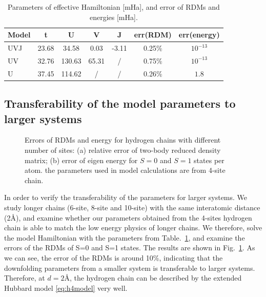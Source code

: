 \documentclass[aps, prb]{revtex4-1}
\begin{document}
\begin{table}[hbt]
\centering
\caption{Parameters of effective Hamiltonian [mHa], and error of RDMs and energies [mHa].}\label{tab:effm_hchain}
\begin{tabular}{||l|c|c|c|c||c|c||}
\hline
Model & t & U & V & J & err(RDM) & err(energy)\\
\hline
\hline
UVJ & 23.68 & 34.58 & 0.03 & -3.11 & 0.25\% & $10^{-13}$\\
UV & 32.76 & 130.63 & 65.31 & / & 0.75\% & $10^{-13}$\\
U & 37.45 & 114.62 & / & / & 0.26\% & $1.8$\\
\hline
\end{tabular}
\end{table}

\subsection{Transferability of the model parameters to larger systems} 
\begin{figure}[hbt]
\centering
{}
\caption{Errors of RDMs and energy for hydrogen chains with different number of sites: (a) relative error of two-body reduced density matrix; (b) error of eigen energy for $S=0$ and $S=1$ states per atom. the parameters used in model calculations are from 4-site chain.}\label{fig:h4transfer}
\end{figure}
In order to verify the transferability of the parameters for larger systems. We study longer chains (6-site, 8-site and 10-site) with the same interatomic distance (2\AA), and examine whether our parameters obtained from the 4-sites hydrogen chain is able to match the low energy physics of longer chains. We therefore, solve the model Hamiltonian with the parameters
from Table.~\ref{tab:effm_hchain}, and examine the errors of the RDMs of S=0 and S=1 states. The results are
shown in Fig.~\ref{fig:h4transfer}. As we can see, the error of the RDMs is around 10\%, indicating that the downfolding parameters from a smaller system is transferable to larger systems.
Therefore, at $d=2$\AA, the hydrogen chain can be described by the extended Hubbard model \eqref{eq:h4model} very well. 
\end{document}
